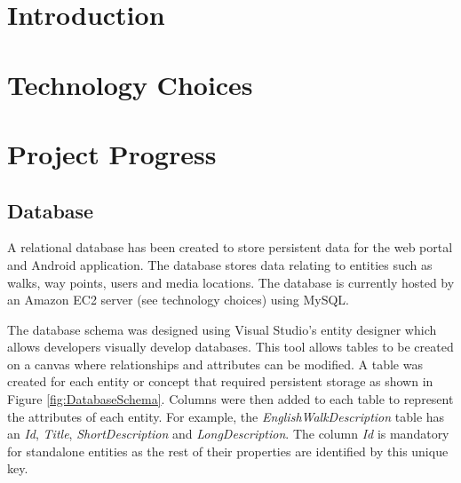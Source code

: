 \documentclass[11pt,a4paper]{article}
\begin{document}


\newpage 

\tableofcontents

\newpage
\section{Introduction}

\section{Technology Choices}

\section{Project Progress}

\subsection{Database}

A relational database has been created to store persistent data for the web portal and Android application.
The database stores data relating to entities such as walks, way points, users and media locations.
The database is currently hosted by an Amazon EC2 server (see technology choices) using MySQL.

The database schema was designed using Visual Studio's entity designer which allows developers visually develop databases.
This tool allows tables to be created on a canvas where relationships and attributes can be modified.
A table was created for each entity or concept that required persistent storage as shown in Figure \ref{fig:DatabaseSchema}.
Columns were then added to each table to represent the attributes of each entity.
For example, the \emph{EnglishWalkDescription} table has an \emph{Id}, \emph{Title}, \emph{ShortDescription} and \emph{LongDescription}. The column \emph{Id} is mandatory for standalone entities as the rest of their properties are identified by this unique key. 
\end{document}

